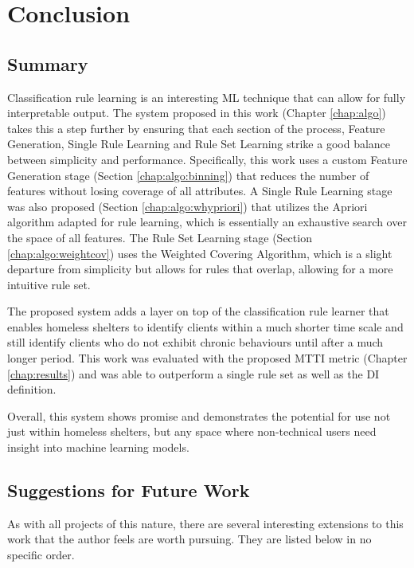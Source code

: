 \chapter{Conclusion} \label{chap:conclusion}

\section{Summary}

Classification rule learning is an interesting ML technique that can allow for fully interpretable output. The system proposed in this work (Chapter \ref{chap:algo}) takes this a step further by ensuring that each section of the process, Feature Generation, Single Rule Learning and Rule Set Learning strike a good balance between simplicity and performance. Specifically, this work uses a custom Feature Generation stage (Section \ref{chap:algo:binning}) that reduces the number of features without losing coverage of all attributes. A Single Rule Learning stage was also proposed (Section \ref{chap:algo:whypriori}) that utilizes the Apriori algorithm adapted for rule learning, which is essentially an exhaustive search over the space of all features. The Rule Set Learning stage (Section \ref{chap:algo:weightcov}) uses the Weighted Covering Algorithm, which is a slight departure from simplicity but allows for rules that overlap, allowing for a more intuitive rule set. 

The proposed \Abb system adds a layer on top of the classification rule learner that enables homeless shelters to identify clients within a much shorter time scale and still identify clients who do not exhibit chronic behaviours until after a much longer period. This work was evaluated with the proposed MTTI metric (Chapter \ref{chap:results}) and was able to outperform a single rule set as well as the DI definition.


Overall, this system shows promise and demonstrates the potential for use not just within homeless shelters, but any space where non-technical users need insight into machine learning models.


\section{Suggestions for Future Work}

As with all projects of this nature, there are several interesting extensions to this work that the author feels are worth pursuing. They are listed below in no specific order.

